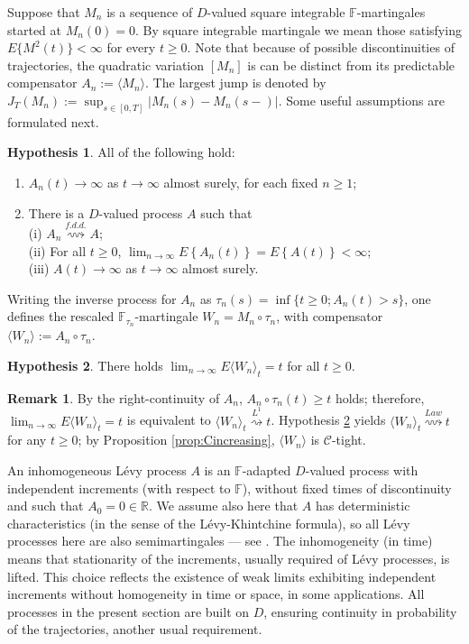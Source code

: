 \documentclass[final]{amsart}
\theoremstyle{definition}
\newtheorem{rem}{Remark}[section]
\newtheorem{hyp}{Hypothesis}[section]
\numberwithin{equation}{section}
\def\disp{\displaystyle}
\def\crochet#1{\langle #1 \rangle}
\newcommand{\dR}{\ensuremath{\mathbb{R}}}
\begin{document}
Suppose that $M_n$ is a sequence of $D$-valued square integrable $\mathbb{F}$-martingales started at $M_n(0)=0$.
By square integrable martingale we mean those satisfying $E\{M^2(t)\}<\infty$ for every $t\ge0$.
Note that because of possible discontinuities of trajectories, the quadratic variation $[M_n]$ is can be distinct from its predictable compensator
$A_n:=\crochet{ M_n }$. The largest jump is denoted by $J_T(M_n) := \sup_{s\in [0,T]}|M_n(s)-M_n(s-)|$.
Some useful assumptions are formulated next.
\begin{hyp}\label{hyp:an_unbounded}
All of the following hold:
\begin{enumerate}
\item[(a)] $A_n(t) \to\infty$ as $t\to\infty$ almost surely, for each fixed $n\ge1$;
\item[(b)] There is a $D$-valued process $A$ such that \\
(i) $A_n \stackrel{f.d.d.}{\rightsquigarrow} A$; \\
(ii) For all $t\ge 0$, $\disp \lim_{n\to\infty} E\left\{A_n(t)\right\}=E\left\{A(t)\right\} < \infty$; \\
(iii) $A(t) \to\infty$ as $t\to\infty$ almost surely.
\end{enumerate}
\end{hyp}
Writing the inverse process for $A_n$ as $\tau_n(s) = \inf\{t\ge0; A_n(t)>s\}$,
one defines the rescaled $\mathbb{F}_{\tau_n}$-martingale $W_n = M_n\circ \tau_n$,
with compensator $\crochet{ W_n } := A_n\circ \tau_n$.
\begin{hyp}\label{hyp:bm_limit}
There holds $\disp \lim_{n\to\infty} E \crochet{ W_n }_t  =t$ for all $t\ge0$.
\end{hyp}
\begin{rem}
By the right-continuity of $A_n$, $A_n\circ \tau_n(t)\ge t$ holds; therefore,
$\lim_{n\to\infty} E\crochet{ W_n }_t  =t$ is equivalent to $\crochet{ W_n }_t \stackrel{L^1}{\rightsquigarrow} t$.
Hypothesis \ref{hyp:bm_limit} yields $\crochet{ W_n }_t \stackrel{Law}{\rightsquigarrow} t$ for any $t\ge 0$;
by Proposition \ref{prop:Cincreasing}, $\crochet{ W_n }$ is $\mathcal{C}$-tight.
\end{rem}
An inhomogeneous L\'evy process $A$ is an $\mathbb{F}$-adapted $D$-valued process with independent increments (with respect to
$\mathbb{F}$), without fixed times of discontinuity and such that $A_0=0\in\dR$. We assume also here that $A$ has deterministic characteristics (in the sense of the L\'evy-Khintchine formula), so all L\'evy processes here are also semimartingales ---
see \citet[Theorem II.4.15]{Jacod/Shiryaev:2003}. The inhomogeneity (in time) means that stationarity of the increments, usually required of L\'evy processes, is lifted. This choice reflects the existence of weak limits exhibiting independent increments without homogeneity in time or space, in some applications. All processes in the present section are built on $D$, ensuring continuity in probability of the trajectories, another usual requirement.
\end{document}
